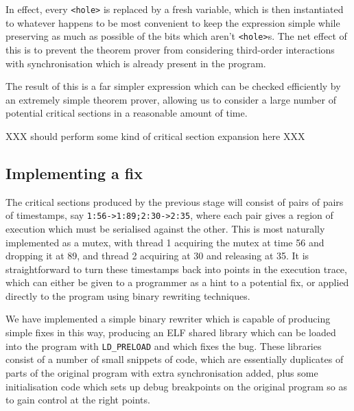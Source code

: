 \documentclass[10pt,a4paper]{report}
\begin{document}
\begin{itemize}
  In effect, every \verb|<hole>| is replaced by a fresh variable,
  which is then instantiated to whatever happens to be most convenient
  to keep the expression simple while preserving as much as possible
  of the bits which aren't \verb|<hole>|s.  The net effect of this is
  to prevent the theorem prover from considering third-order
  interactions with synchronisation which is already present in the
  program.  
\end{itemize}

The result of this is a far simpler expression which can be checked
efficiently by an extremely simple theorem prover, allowing us to
consider a large number of potential critical sections in a reasonable
amount of time.

XXX should perform some kind of critical section expansion here XXX

\subsection{Implementing a fix}

The critical sections produced by the previous stage will consist of
pairs of pairs of timestamps, say \verb|1:56->1:89;2:30->2:35|, where
each pair gives a region of execution which must be serialised against
the other.  This is most naturally implemented as a mutex, with thread
1 acquiring the mutex at time 56 and dropping it at 89, and thread 2
acquiring at 30 and releasing at 35.  It is straightforward to turn
these timestamps back into points in the execution trace, which can
either be given to a programmer as a hint to a potential fix, or
applied directly to the program using binary rewriting techniques.

We have implemented a simple binary rewriter which is capable of
producing simple fixes in this way, producing an ELF shared library
which can be loaded into the program with \verb|LD_PRELOAD| and which
fixes the bug.  These libraries consist of a number of small snippets
of code, which are essentially duplicates of parts of the original
program with extra synchronisation added, plus some initialisation
code which sets up debug breakpoints on the original program so as to
gain control at the right points.
\end{document}
